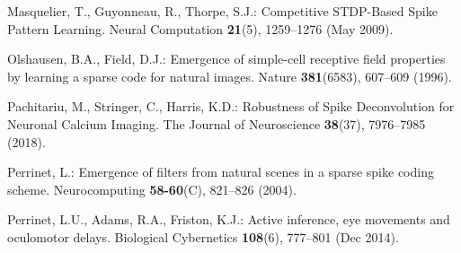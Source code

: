 \documentclass[runningheads]{llncs}
\begin{document}
\begin{thebibliography}{10}
  Masquelier, T., Guyonneau, R., Thorpe, S.J.: Competitive {STDP}-{Based} {Spike} {Pattern} {Learning}. Neural Computation  \textbf{21}(5),  1259--1276 (May 2009). %
  
  Olshausen, B.A., Field, D.J.: Emergence of simple-cell receptive field properties by learning a sparse code for natural images. Nature  \textbf{381}(6583),  607--609 (1996). %
  
  Pachitariu, M., Stringer, C., Harris, K.D.: Robustness of {Spike} {Deconvolution} for {Neuronal} {Calcium} {Imaging}. The Journal of Neuroscience  \textbf{38}(37),  7976--7985 (2018). %
  
  
  Perrinet, L.: Emergence of filters from natural scenes in a sparse spike coding scheme. Neurocomputing  \textbf{58-60}(C),  821--826 (2004). %
  
  Perrinet, L.U., Adams, R.A., Friston, K.J.: Active inference, eye movements and oculomotor delays. Biological Cybernetics  \textbf{108}(6),  777--801 (Dec 2014). %
  
  

\end{thebibliography}
\end{document}
